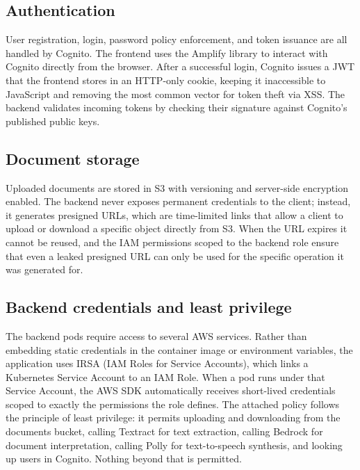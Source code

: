 \subsection{Authentication}

\par User registration, login, password policy enforcement, and token issuance are all handled by Cognito. The frontend uses the Amplify library to interact with Cognito directly from the browser. After a successful login, Cognito issues a JWT that the frontend stores in an HTTP-only cookie, keeping it inaccessible to JavaScript and removing the most common vector for token theft via XSS. The backend validates incoming tokens by checking their signature against Cognito's published public keys.

\subsection{Document storage}

\par Uploaded documents are stored in S3 with versioning and server-side encryption enabled. The backend never exposes permanent credentials to the client; instead, it generates presigned URLs, which are time-limited links that allow a client to upload or download a specific object directly from S3. When the URL expires it cannot be reused, and the IAM permissions scoped to the backend role ensure that even a leaked presigned URL can only be used for the specific operation it was generated for.

\subsection{Backend credentials and least privilege}

\par The backend pods require access to several AWS services. Rather than embedding static credentials in the container image or environment variables, the application uses IRSA (IAM Roles for Service Accounts), which links a Kubernetes Service Account to an IAM Role. When a pod runs under that Service Account, the AWS SDK automatically receives short-lived credentials scoped to exactly the permissions the role defines. The attached policy follows the principle of least privilege: it permits uploading and downloading from the documents bucket, calling Textract for text extraction, calling Bedrock for document interpretation, calling Polly for text-to-speech synthesis, and looking up users in Cognito. Nothing beyond that is permitted.

